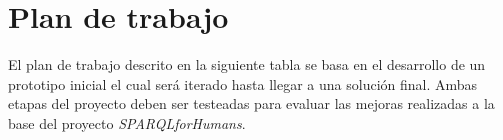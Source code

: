 \documentclass[conference,compsoc]{IEEEtran}
\begin{document}

    \section{Plan de trabajo}

El plan de trabajo descrito en la siguiente tabla se basa en el desarrollo
de un prototipo inicial el cual será iterado hasta llegar a una solución final. Ambas etapas
del proyecto deben ser testeadas para evaluar las mejoras realizadas a la base del proyecto
\textit{SPARQLforHumans}.
\end{document}
